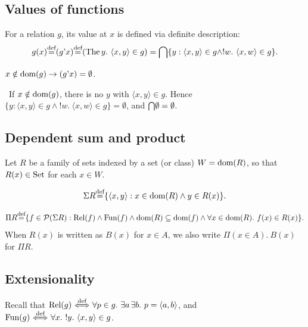 \documentclass[10pt,a4paper]{article}
\begin{document}
\subsection{Values of functions}
For a relation $g$, its value at $x$ is defined via definite description:
$$g(x) {\stackrel{{\textrm{def}}}{=}} (g{\textrm{'}} x) {\stackrel{{\textrm{def}}}{=}} ({\textrm{The\,}} y.\ \langle x, y\rangle \in g) = {\bigcap} \{y : \langle x,y\rangle \in g \land !w.\ \langle x,w\rangle \in g\}.$$

\begin{exercise}
$x\notin {\textrm{dom}}(g)\to (g{\textrm{'}} x)=\emptyset$.
\end{exercise}
\myprf\ If $x \notin {\textrm{dom}}(g)$, there is no $y$ with $\langle x,y\rangle \in g$. Hence $\{y : \langle x,y\rangle \in g \land !w.\ \langle x,w\rangle \in g\} = \emptyset$, and ${\bigcap} \emptyset = \emptyset$. \myqed

\subsection{Dependent sum and product}
Let $R$ be a family of sets indexed by a set (or class) $W = {\textrm{dom}}(R)$, so that $R(x) \in {\textrm{Set}}$ for each $x \in W$.
\begin{definition}
$$\Sigma R {\stackrel{{\textrm{def}}}{=}} \{\langle x, y\rangle : x \in {\textrm{dom}}(R) \land y\in R(x)\}.$$
\end{definition}
\begin{definition}
$$\Pi R {\stackrel{{\textrm{def}}}{=}} \{ f\in {\mathcal{P}}(\Sigma R) : {\textrm{Rel}}(f) \land {\textrm{Fun}}(f) \land {\textrm{dom}}(R)\subseteq {\textrm{dom}}(f) \land \forall x\in{\textrm{dom}}(R).\ f(x)\in R(x)\}.$$
When $R(x)$ is written as $B(x)$ for $x \in A$, we also write $\Pi(x \in A).\ B(x)$ for $\Pi R$.
\end{definition}

\subsection{Extensionality}
Recall that ${\textrm{Rel}}(g) {\stackrel{{\textrm{def}}}{\ \Longleftrightarrow\ }} \forall p \in g.\ \exists a\, \exists b.\ p = \langle a,b\rangle$, and ${\textrm{Fun}}(g) {\stackrel{{\textrm{def}}}{\ \Longleftrightarrow\ }} \forall x.\ !y.\ \langle x,y\rangle \in g$.
\end{document}
